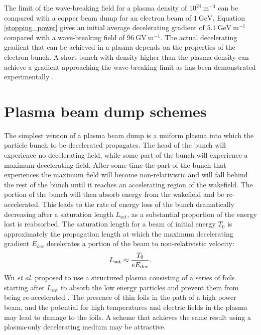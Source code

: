 \documentclass[aip,pop,preprint,superscriptaddress]{revtex4-1}
\begin{document}
The limit of the wave-breaking field for a plasma density of $10^{24}{\mathrm{\ m^{-3}}}$ can be compared with a copper beam dump for an electron beam of $1{\mathrm{\ GeV}}$. Equation \ref{stopping_power} gives an initial average decelerating gradient of $5.1{\mathrm{\ GeV\ m^{-1}}}$ compared with a wave-breaking field of $96{\mathrm{\ GV\ m^{-1}}}$. The actual decelerating gradient that can be achieved in a plasma depends on the properties of the electron bunch. A short bunch with density higher than the plasma density can achieve a gradient approaching the wave-breaking limit as has been demonstrated experimentally \cite{Hogan,Blumenfeld,Litos,Corde}.

\section{Plasma beam dump schemes}
\label{sec:dump_schemes}
The simplest version of a plasma beam dump is a uniform plasma into which the particle bunch to be decelerated propagates. The head of the bunch will experience no decelerating field, while some part of the bunch will experience a maximum decelerating field. After some time the part of the bunch that experiences the maximum field will become non-relativistic and will fall behind the rest of the bunch until it reaches an accelerating region of the wakefield. The portion of the bunch will then absorb energy from the wakefield and be re-accelerated. This leads to the rate of energy loss of the bunch dramatically decreasing after a saturation length $L_{\mathrm{sat}}$, as a substantial proportion of the energy lost is reabsorbed. The saturation length for a beam of initial energy $T_0$ is approximately the propagation length at which the maximum decelerating gradient $E_{\mathrm{dec}}$ decelerates a portion of the beam to non-relativistic velocity:
\begin{equation}
  L_{\mathrm{sat}} \approx {{T_0}\over{e E_{\mathrm{dec}}}}.
\end{equation}
Wu {\it et al.} proposed to use a structured plasma consisting of a series of foils starting after $L_{\mathrm{sat}}$ to absorb the low energy particles and prevent them from being re-accelerated \cite{Wu}. The presence of thin foils in the path of a high power beam, and the potential for high temperatures and electric fields in the plasma may lead to damage to the foils. A scheme that achieves the same result using a plasma-only decelerating medium may be attractive.
\end{document}
